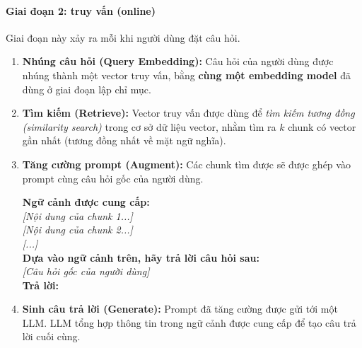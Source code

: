 \paragraph{Giai đoạn 2: truy vấn (online)}
Giai đoạn này xảy ra mỗi khi người dùng đặt câu hỏi.
\begin{enumerate}
	\item \textbf{Nhúng câu hỏi (Query Embedding):} Câu hỏi của người dùng được nhúng thành một vector truy vấn, bằng \textbf{cùng một embedding model} đã dùng ở giai đoạn lập chỉ mục.
	\item \textbf{Tìm kiếm (Retrieve):} Vector truy vấn được dùng để \textit{tìm kiếm tương đồng (similarity search)} trong cơ sở dữ liệu vector, nhằm tìm ra $k$ chunk có vector gần nhất (tương đồng nhất về mặt ngữ nghĩa).
	\item \textbf{Tăng cường prompt (Augment):} Các chunk tìm được sẽ được ghép vào prompt cùng câu hỏi gốc của người dùng.
	\begin{promptbox}
		\textbf{Ngữ cảnh được cung cấp:} \\
		\textit{[Nội dung của chunk 1...]} \\
		\textit{[Nội dung của chunk 2...]} \\
		\textit{[...]} \\
		\textbf{Dựa vào ngữ cảnh trên, hãy trả lời câu hỏi sau:} \\
		\textit{[Câu hỏi gốc của người dùng]} \\
		\textbf{Trả lời:}
	\end{promptbox}
	\item \textbf{Sinh câu trả lời (Generate):} Prompt đã tăng cường được gửi tới một LLM. LLM tổng hợp thông tin trong ngữ cảnh được cung cấp để tạo câu trả lời cuối cùng.
\end{enumerate}

\begin{center}
	\label{fig:rag_pipeline_diagram}
\end{center}

